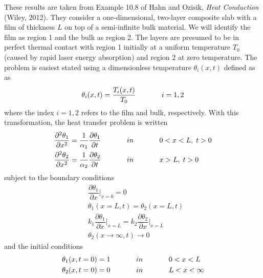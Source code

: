 \documentclass[letterpaper,11pt]{article}
\begin{document}
These results are taken from Example 10.8 of Hahn and Ozisik, \emph{Heat Conduction} (Wiley, 2012).  They consider a one-dimensional, two-layer composite slab with a film  of thickness $L$ on top of a semi-infinite bulk material.   We will identify the film as region 1 and the bulk as region 2.   The layers are presumed to be in perfect thermal contact with region 1 initially at a uniform temperature $T_0$ (caused by rapid laser energy absorption) and region 2 at zero temperature.  The problem is easiest stated using a dimensionless temperature $\theta_i(x,t)$ defined as as
\begin{equation}
\theta_i(x,t) = \dfrac{T_i(x,t)}{T_0} \hspace{0.5in} i = 1,2 
\end{equation}
where the index $i = 1,2$ refers to the film and bulk, respectively.  With this transformation, the heat transfer problem is written
\begin{subequations}
\begin{align}
\dfrac{\partial^2 \theta_1}{\partial x^2} &= \dfrac{1}{\alpha_1}\dfrac{\partial \theta_1}{\partial t} \hspace{0.5in} in \hspace{0.5in} 0<x<L, \; t>0 \\
\dfrac{\partial^2 \theta_2}{\partial x^2} &= \dfrac{1}{\alpha_2}\dfrac{\partial \theta_2}{\partial t} \hspace{0.5in} in \hspace{0.5in} x>L,\; t>0
\end{align}
\end{subequations}
subject to the boundary conditions
\begin{subequations}
\begin{align}
& \dfrac{\partial \theta_1}{\partial x} \Big| _{x=0} = 0 \\
& \theta_1(x=L,t) = \theta_2(x=L,t) \\
& k_1 \dfrac{\partial\theta_1}{\partial x} \Big| _{x=L} = k_2  \dfrac{\partial\theta_2}{\partial x} \Big| _{x=L} \\
& \theta_2(x \rightarrow \infty,t) \rightarrow 0
\end{align}
\end{subequations}
and the initial conditions
\begin{subequations}
\begin{align}
& \theta_1(x, t=0) = 1 \hspace{0.5in} in \hspace{0.5in} 0<x<L \\
& \theta_2(x, t=0) = 0 \hspace{0.5in} in \hspace{0.5in} L<x<\infty
\end{align}
\end{subequations}
\end{document}
